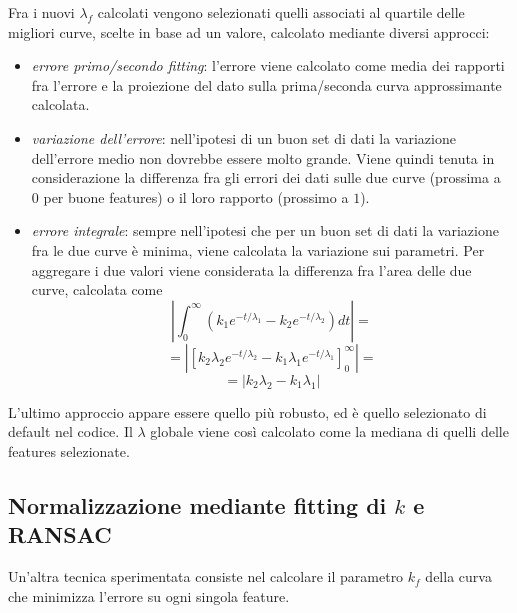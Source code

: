 \documentclass[12pt]{report}
\begin{document}
\noindent Fra i nuovi $\lambda_f$ calcolati vengono selezionati quelli associati al quartile delle migliori curve, scelte in base ad un valore, calcolato mediante diversi approcci:

\begin{itemize}
	\item	\emph{errore primo/secondo fitting}: l'errore viene calcolato come media dei rapporti fra l'errore e la proiezione del dato sulla prima/seconda curva approssimante calcolata.
	\item	\emph{variazione dell'errore}: nell'ipotesi di un buon set di dati la variazione dell'errore medio non dovrebbe essere molto grande. Viene quindi tenuta in considerazione la differenza fra gli errori dei dati sulle due curve (prossima a $0$ per buone features) o il loro rapporto (prossimo a $1$).
	\item	\emph{errore integrale}: sempre nell'ipotesi che per un buon set di dati la variazione fra le due curve \`e minima, viene calcolata la variazione sui parametri. Per aggregare i due valori viene considerata la differenza fra l'area delle due curve, calcolata come $$\left|\int^{\infty}_0\left(k_1e^{-t/\lambda_1} - k_2e^{-t/\lambda_2}\right)dt\right| =$$ $$= \left|\left[ k_2\lambda_2e^{-t/\lambda_2} - k_1\lambda_1e^{-t/\lambda_1} \right]^\infty_0\right| =$$ $$ = \left|k_2\lambda_2 - k_1\lambda_1\right|$$
\end{itemize}

\noindent L'ultimo approccio appare essere quello pi\`u robusto, ed \`e quello selezionato di default nel codice. Il $\lambda$ globale viene cos\`i calcolato come la mediana di quelli delle features selezionate.

\subsection{Normalizzazione mediante fitting di $k$ e RANSAC}

\noindent Un'altra tecnica sperimentata consiste nel calcolare il parametro $k_f$ della curva che minimizza l'errore su ogni singola feature.\\
\end{document}
